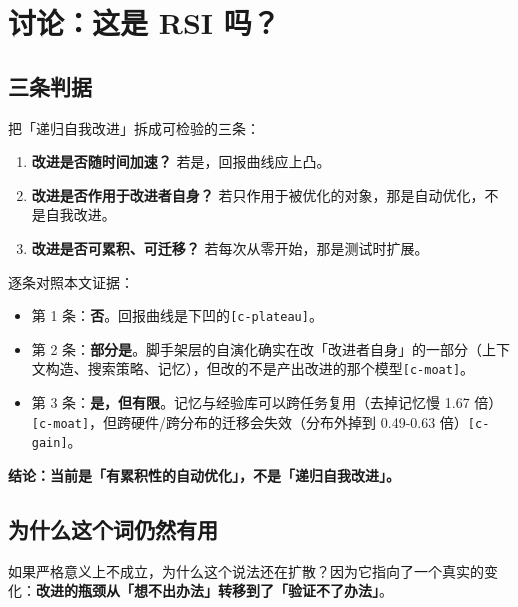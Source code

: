 \section{讨论：这是 RSI 吗？}

\subsection{三条判据}

把「递归自我改进」拆成可检验的三条：


\begin{enumerate}
  \item \textbf{改进是否随时间加速？} 若是，回报曲线应上凸。
  \item \textbf{改进是否作用于改进者自身？} 若只作用于被优化的对象，那是自动优化，不是自我改进。
  \item \textbf{改进是否可累积、可迁移？} 若每次从零开始，那是测试时扩展。
\end{enumerate}

逐条对照本文证据：


\begin{itemize}
  \item 第 1 条：\textbf{否}。回报曲线是下凹的{\scriptsize\texttt{[c-\hspace{0pt}plateau]}}。
  \item 第 2 条：\textbf{部分是}。脚手架层的自演化确实在改「改进者自身」的一部分（上下文构造、搜索策略、记忆），但改的不是产出改进的那个模型{\scriptsize\texttt{[c-\hspace{0pt}moat]}}。
  \item 第 3 条：\textbf{是，但有限}。记忆与经验库可以跨任务复用（去掉记忆慢 1.67 倍）{\scriptsize\texttt{[c-\hspace{0pt}moat]}}，但跨硬件/跨分布的迁移会失效（分布外掉到 0.49-\hspace{0pt}0.63 倍）{\scriptsize\texttt{[c-\hspace{0pt}gain]}}。
\end{itemize}

\textbf{结论：当前是「有累积性的自动优化」，不是「递归自我改进」。}


\subsection{为什么这个词仍然有用}

如果严格意义上不成立，为什么这个说法还在扩散？因为它指向了一个真实的变化：\textbf{改进的瓶颈从「想不出办法」转移到了「验证不了办法」}。


